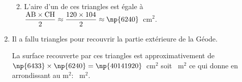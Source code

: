 \begin{enumerate}
\begin{enumerate}
\begin{multicols}{2}
\end{multicols}

		\item%
L'aire d'un de ces triangles est égale à
$\dfrac{\text{AB}\times \text{CH}}{2} \approx \dfrac{120\times 104}{2} \approx \np{6240}$~cm$^2$.



 	\end{enumerate}

\item Il a fallu  triangles pour recouvrir la partie extérieure de la Géode.
	

La surface recouverte par ces triangles est approximativement de
$\np{6433}\times\np{6240} = \np{40141920}$~cm$^2$ soit ~m$^2$ ce qui donne en arrondissant au m$^2$: ~m$^2$.  

\end{enumerate}

%

\vspace{0,5cm}

